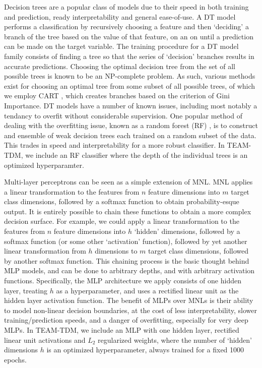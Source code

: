 \documentclass[conference]{IEEEtran}
\begin{document}
Decision trees \cite{quinlan1986induction} are a popular class of models due to their speed in both training and prediction, ready interpretability and general ease-of-use.
 A DT model performs a classification by recursively choosing a feature and then `deciding' a branch of the tree based on the value of that feature, on an on until a prediction can be made on the target variable.
 The training procedure for a DT model family consists of finding a tree so that the series of `decision' branches results in accurate predictions.
 Choosing the optimal decision tree from the set of all possible trees is known to be an NP-complete problem.
 As such, various methods exist for choosing an optimal tree from some subset of all possible trees, of which we employ CART \cite{breiman1984classification}, which creates branches based on the criterion of Gini Importance.
 DT models have a number of known issues, including most notably a tendancy to overfit without considerable supervision.
 One popular method of dealing with the overfitting issue, known as a random forest (RF) \cite{ho1995random}, is to construct and ensemble of weak decision trees each trained on a random subset of the data.
 This trades in speed and interpretability for a more robust classifier.
 In TEAM-TDM, we include an RF classifier where the depth of the individual trees is an optimized hyperparamter.

Multi-layer perceptrons \cite{rumelhart1985learning} can be seen as a simple extension of MNL.
 MNL applies a linear transformation to the features from $n$ feature dimensions into $m$ target class dimensions, followed by a softmax function to obtain probability-esque output.
 It is entirely possible to chain these functions to obtain a more complex decision surface.
 For example, we could apply a linear transformation to the features from $n$ feature dimensions into $h$ `hidden' dimensions, followed by a softmax function (or some other `activation' function), followed by yet another linear transformation from $h$ dimensions to $m$ target class dimensions, followed by another softmax function.
 This chaining process is the basic thought behind MLP models, and can be done to arbitrary depths, and with arbitrary activation functions.
 Specifically, the MLP architecture we apply consists of one hidden layer, treating $h$ as a hyperparameter, and uses a rectified linear unit as the hidden layer activation function.
 The benefit of MLPs over MNLs is their ability to model non-linear decision boundaries, at the cost of less interpretability, slower training/prediction speeds, and a danger of overfitting, especially for very deep MLPs.
 In TEAM-TDM, we include an MLP with one hidden layer, rectified linear unit activations and $L_2$ regularized weights, where the number of `hidden' dimensions $h$ is an optimized hyperparameter, always trained for a fixed 1000 epochs.
\end{document}
